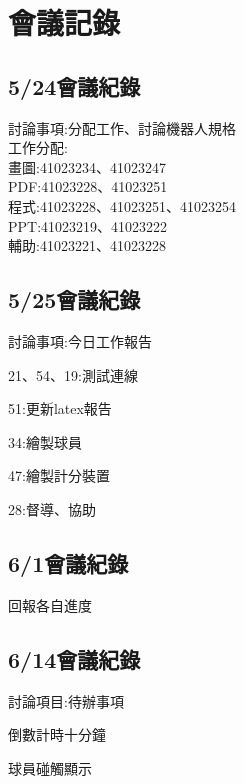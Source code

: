 \chapter{會議記錄}


\section{5/24會議紀錄}


討論事項:分配工作、討論機器人規格\\


工作分配:\\
畫圖:41023234、41023247\\
PDF:41023228、41023251\\
程式:41023228、41023251、41023254\\
PPT:41023219、41023222\\
輔助:41023221、41023228\\


\section{5/25會議紀錄}

討論事項:今日工作報告

21、54、19:測試連線

51:更新latex報告

34:繪製球員

47:繪製計分裝置

28:督導、協助

\section{6/1會議紀錄}
回報各自進度
\section{6/14會議紀錄}
討論項目:待辦事項

倒數計時十分鐘

球員碰觸顯示




	